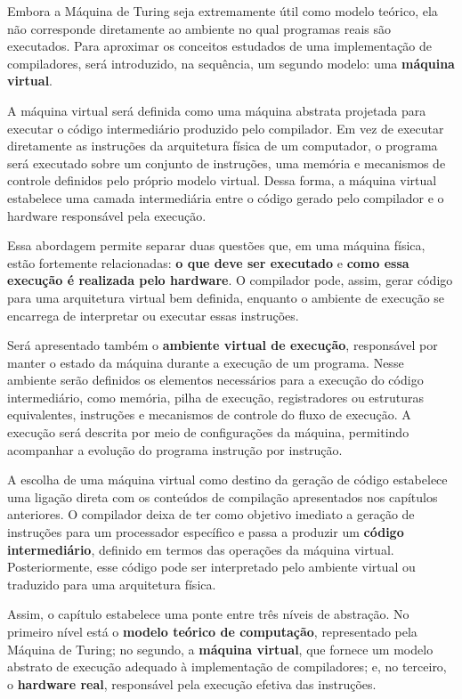 \documentclass[
  brazilian,
  letterpaper,
]{book}
\theoremstyle{plain}
\theoremstyle{definition}
\theoremstyle{remark}
\begin{document}
Embora a Máquina de Turing seja extremamente útil como modelo teórico,
ela não corresponde diretamente ao ambiente no qual programas reais são
executados. Para aproximar os conceitos estudados de uma implementação
de compiladores, será introduzido, na sequência, um segundo modelo: uma
\textbf{máquina virtual}.

A máquina virtual será definida como uma máquina abstrata projetada para
executar o código intermediário produzido pelo compilador. Em vez de
executar diretamente as instruções da arquitetura física de um
computador, o programa será executado sobre um conjunto de instruções,
uma memória e mecanismos de controle definidos pelo próprio modelo
virtual. Dessa forma, a máquina virtual estabelece uma camada
intermediária entre o código gerado pelo compilador e o hardware
responsável pela execução.

Essa abordagem permite separar duas questões que, em uma máquina física,
estão fortemente relacionadas: \textbf{o que deve ser executado} e
\textbf{como essa execução é realizada pelo hardware}. O compilador
pode, assim, gerar código para uma arquitetura virtual bem definida,
enquanto o ambiente de execução se encarrega de interpretar ou executar
essas instruções.

Será apresentado também o \textbf{ambiente virtual de execução},
responsável por manter o estado da máquina durante a execução de um
programa. Nesse ambiente serão definidos os elementos necessários para a
execução do código intermediário, como memória, pilha de execução,
registradores ou estruturas equivalentes, instruções e mecanismos de
controle do fluxo de execução. A execução será descrita por meio de
configurações da máquina, permitindo acompanhar a evolução do programa
instrução por instrução.

A escolha de uma máquina virtual como destino da geração de código
estabelece uma ligação direta com os conteúdos de compilação
apresentados nos capítulos anteriores. O compilador deixa de ter como
objetivo imediato a geração de instruções para um processador específico
e passa a produzir um \textbf{código intermediário}, definido em termos
das operações da máquina virtual. Posteriormente, esse código pode ser
interpretado pelo ambiente virtual ou traduzido para uma arquitetura
física.

Assim, o capítulo estabelece uma ponte entre três níveis de abstração.
No primeiro nível está o \textbf{modelo teórico de computação},
representado pela Máquina de Turing; no segundo, a \textbf{máquina
virtual}, que fornece um modelo abstrato de execução adequado à
implementação de compiladores; e, no terceiro, o \textbf{hardware real},
responsável pela execução efetiva das instruções.
\end{document}
